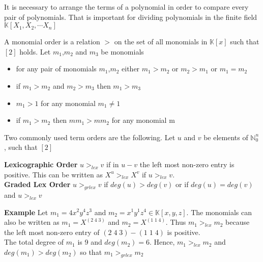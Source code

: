 It is necessary to arrange the terms of a polynomial in order to compare every pair of polynomials. That is important for dividing polynomials in the finite field
$ \mathbb{K} \left[X_{1},X_{2},\cdots X_{n}\right]  $

\begin{env_definition} 

A monomial order is a relation $>$ on the set of all monomials in $\mathbb{K}\left[x\right] $ such that $\left[ 2\right] $ holds.
Let $m_{1}$,$m_{2}$ and $m_{3}$ be monomials
\begin{center}

\begin{itemize}

\item
for any pair of monomials $m_{1}$,$m_{2}$ either $m_{1} > m_{2}$ or $m_{2} > m_{1}$ or $m_{1} = m_{2}$ 
\item
if $m_{1} > m_{2} $ and $m_{2} > m_{3}$ then $m_{1} > m_{3}$
\item
$m_{1} > 1$ for any monomial $m_{1} \neq 1$
\item
if $m_{1} > m_{2}$ then $mm_{1} > mm_{2}$ for any monomial m

\end{itemize}
 
\end{center}

\end{env_definition}


Two commonly used term orders are the following.
Let $u$ and $v$ be elements of $\mathbb{N}^{n}_{0}$, such that $\left[ 2\right] $

\textbf{Lexicographic Order}
$u >_{lex} v $ if in $u-v$ the left most non-zero entry is positive.
This can be written as $X^{u} >_{lex} X^{v}$ if $u >_{lex} v $.\\


\textbf{Graded Lex Order}
$u >_{grlex} v $ if $ deg(u)>deg(v)$ or if $ deg(u)=deg(v)$ and $u >_{lex} v$

\textbf{Example} Let $m_{1} = 4x^{2}y^{4}z^{3}$ and $m_{2}= x^{1}y^{1}z^{4} \in \mathbb{K}\left[ x,y,z\right]  $.
The monomials can also be written as $m_{1} = X^{(2 \; 4 \; 3)}$ and $m_{2} = X^{(1 \; 1 \; 4)}$.
Thus $m_{1}>_{lex} m_{2}$ because the left most non-zero entry of $ (2 \; 4 \; 3) - (1 \; 1 \; 4)$ is positive.\\

The total degree of $m_{1}$ is 9 and $deg(m_{2})=6$. Hence, $m_{1}>_{lex} m_{2}$ and
$deg(m_{1})>deg(m_{2})$ so that $m_{1}>_{grlex} m_{2}$   

